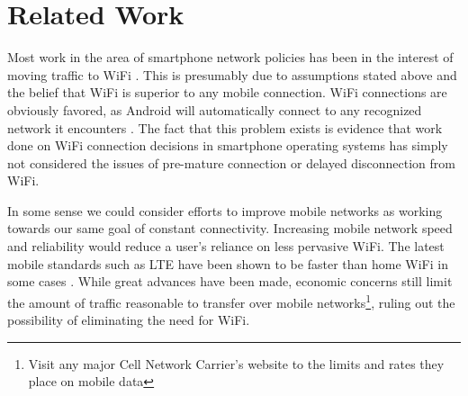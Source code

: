 \section{Related Work}
\label{sec:related}

Most work in the area of smartphone network policies has been in the interest of moving traffic to WiFi \cite{Lee:2010:MDO:1921168.1921203}. This is presumably due to assumptions stated above and the belief that WiFi is superior to any mobile connection. WiFi connections are obviously favored, as Android will automatically connect to any recognized network it encounters \cite{Google:2013}. The fact that this problem exists is evidence that work done on WiFi connection decisions in smartphone operating systems has simply not considered the issues of pre-mature connection or delayed disconnection from WiFi.

In some sense we could consider efforts to improve mobile networks as working towards our same goal of constant connectivity. Increasing mobile network speed and reliability would reduce a user's reliance on less pervasive WiFi. The latest mobile standards such as LTE have been shown to be faster than home WiFi in some cases \cite{Huang:2012:CEP:2307636.2307658}. While great advances have been made, economic concerns still limit the amount of traffic reasonable to transfer over mobile networks\footnote{Visit any major Cell Network Carrier's website to the limits and rates they place on mobile data}, ruling out the possibility of eliminating the need for WiFi.